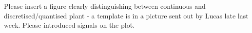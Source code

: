 \documentclass{sig-alternate-05-2015}
\newcommand{\blue}[1]{{\color{blue}#1}}
\begin{document}
\blue{Please insert a figure clearly distinguishing between continuous and discretised/quantised plant - a template is in a picture sent out by Lucas late last week. Please introduced signals on the plot. 

}
\end{document}
